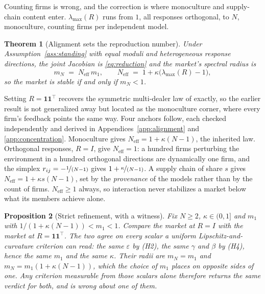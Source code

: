 \documentclass{article}
\theoremstyle{plain}
\newtheorem{theorem}{Theorem}
\newtheorem{proposition}[theorem]{Proposition}
\theoremstyle{definition}
\newcommand{\Neff}{N_{\mathrm{eff}}}
\newcommand{\mN}{m_N}
\newcommand{\lmax}{\lambda_{\max}}
\begin{document}
Counting firms is wrong, and the correction is where monoculture and supply-chain content enter. $\lmax(R)$ runs from $1$, all responses orthogonal, to $N$, monoculture, counting firms per independent model.

\begin{theorem}[Alignment sets the reproduction number]
\label{thm:alignment}
Under Assumption~\ref{ass:standing} with equal moduli and heterogeneous response directions, the joint Jacobian is \eqref{eq:reduction} and the market's spectral radius is
\begin{equation}
\mN \;=\; \Neff\, m_1, \qquad \Neff \;=\; 1 + \kappa\bigl(\lmax(R) - 1\bigr),
\end{equation}
so the market is stable if and only if $\mN < 1$.
\end{theorem}

Setting $R = \mathbf{1}\mathbf{1}^{\top}$ recovers the symmetric multi-dealer law of \citet{reflex2026} exactly, so the earlier result is not generalized away but located as the monoculture corner, where every firm's feedback points the same way. Four anchors follow, each checked independently and derived in Appendices~\ref{app:alignment} and \ref{app:concentration}. Monoculture gives $\Neff = 1+\kappa(N-1)$, the inherited law. Orthogonal responses, $R=I$, give $\Neff = 1$: a hundred firms perturbing the environment in a hundred orthogonal directions are dynamically one firm, and the simplex $r_{ij} = -\nicefrac{1}{(N-1)}$ gives $1+\nicefrac{\kappa}{(N-1)}$. A supply chain of share $s$ gives $\Neff = 1+\kappa s(N-1)$, set by the \emph{provenance} of the models rather than by the count of firms. $\Neff \geq 1$ always, so interaction never stabilizes a market below what its members achieve alone.

\begin{proposition}[Strict refinement, with a witness]
\label{prop:containment}
Fix $N \geq 2$, $\kappa \in (0,1]$ and $m_1$ with $1/(1+\kappa(N-1)) < m_1 < 1$. Compare the market at $R = I$ with the market at $R = \mathbf{1}\mathbf{1}^{\top}$. The two agree on every scalar a uniform Lipschitz-and-curvature criterion can read: the same $\varepsilon$ by \textup{(H2)}, the same $\gamma$ and $\beta$ by \textup{(H4)}, hence the same $m_1$ and the same $\kappa$. Their radii are $\mN = m_1$ and $\mN = m_1(1+\kappa(N-1))$, which the choice of $m_1$ places on opposite sides of one. Any criterion measurable from those scalars alone therefore returns the same verdict for both, and is wrong about one of them.
\end{proposition}
\end{document}
